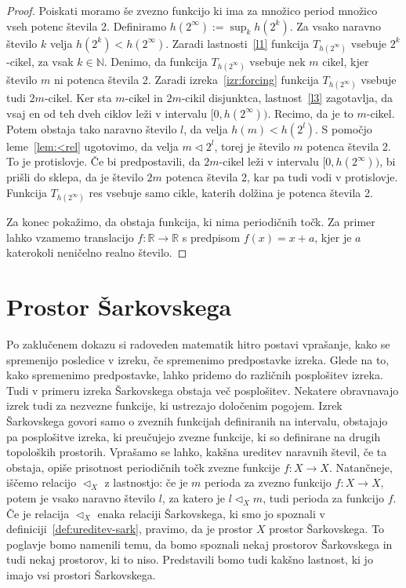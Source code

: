 \documentclass[mat2]{fmfdelo}
\newcommand{\R}{\mathbb R}
\newcommand{\N}{\mathbb N}
\begin{document}
\begin{proof}
Poiskati moramo še zvezno funkcijo ki ima za množico period množico vseh potenc števila 2. Definiramo $h(2^{\infty}) := \sup_k h(2^k)$. Za vsako naravno število $k$ velja $h(2^k) < h(2^{\infty})$. Zaradi lastnosti~\ref{l1} funkcija $T_{h(2^{\infty})}$ vsebuje $2^k$-cikel, za vsak $k \in \N$. 
Denimo, da funkcija $T_{h(2^{\infty})}$ vsebuje nek $m$ cikel, kjer število $m$ ni potenca števila 2. Zaradi izreka~\ref{izr:forcing} funkcija $T_{h(2^{\infty})}$ vsebuje tudi $2m$-cikel. Ker sta $m$-cikel in $2m$-cikil disjunktca, lastnost~\ref{l3} zagotavlja, da vsaj en od teh dveh ciklov leži v intervalu $[0, h(2^{\infty}))$. Recimo, da je to $m$-cikel. Potem obstaja tako naravno število $l$, da velja $h(m) < h(2^l)$. S pomočjo leme~\ref{lem:<rel} ugotovimo, da velja $m \triangleleft 2^l$, torej je število $m$ potenca števila 2. To je protislovje. Če bi predpostavili, da $2m$-cikel leži v intervalu $[0, h(2^{\infty}))$, bi prišli do sklepa, da je število $2m$ potenca števila 2, kar pa tudi vodi v protislovje. Funkcija $T_{h(2^{\infty})}$ res vsebuje samo cikle, katerih dolžina je potenca števila 2.

Za konec pokažimo, da obstaja funkcija, ki nima periodičnih točk. Za primer lahko vzamemo translacijo $f : \R \to \R$ s predpisom $f(x) = x + a$, kjer je $a$ katerokoli neničelno realno število.
\end{proof}


\section{Prostor Šarkovskega}
Po zaklučenem dokazu si radoveden matematik hitro postavi vprašanje, kako se spremenijo posledice v izreku, če spremenimo predpostavke izreka. Glede na to, kako spremenimo predpostavke, lahko pridemo do različnih posplošitev izreka. Tudi v primeru izreka Šarkovskega obstaja več posplošitev. Nekatere obravnavajo izrek tudi za nezvezne funkcije, ki ustrezajo določenim pogojem. Izrek Šarkovskega govori samo o zveznih funkcijah definiranih na intervalu, obstajajo pa posplošitve izreka, ki preučujejo zvezne funkcije, ki so definirane na drugih topoloških prostorih. Vprašamo se lahko, kakšna ureditev naravnih števil, če ta obstaja, opiše prisotnost periodičnih točk zvezne funkcije $f:X \to X$. Natančneje, iščemo relacijo $\triangleleft_X$ z lastnostjo: če je $m$ perioda za zvezno funkcijo $f:X \to X$, potem je vsako naravno število $l$, za katero je $l \triangleleft_X m$, tudi perioda za funkcijo $f$. Če je relacija $\triangleleft_X$ enaka relaciji Šarkovskega, ki smo jo spoznali v definiciji~\ref{def:ureditev-sark}, pravimo, da je prostor $X$ prostor Šarkovskega. To poglavje bomo namenili temu, da bomo spoznali nekaj prostorov Šarkovskega in tudi nekaj prostorov, ki to niso. Predstavili bomo tudi kakšno lastnost, ki jo imajo vsi prostori Šarkovskega. 
\end{document}
